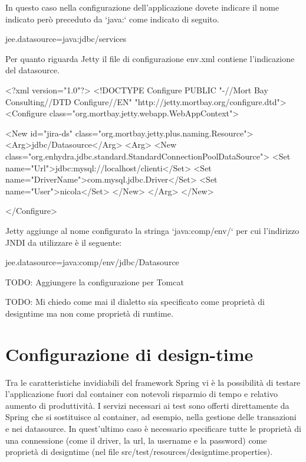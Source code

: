 In questo caso nella configurazione dell'applicazione dovete indicare il nome indicato però preceduto da `java:` come indicato di seguito.

\begin{bash}
jee.datasource=java:jdbc/services
\end{bash}



Per quanto riguarda Jetty il file di configurazione env.xml contiene l'indicazione del datasource.

\begin{xml}
<?xml version="1.0"?>
<!DOCTYPE Configure PUBLIC "-//Mort Bay Consulting//DTD Configure//EN" "http://jetty.mortbay.org/configure.dtd">
<Configure class="org.mortbay.jetty.webapp.WebAppContext">

  <New id="jira-ds" class="org.mortbay.jetty.plus.naming.Resource">
     <Arg>jdbc/Datasource</Arg>
       <Arg>
         <New class="org.enhydra.jdbc.standard.StandardConnectionPoolDataSource">
           <Set name="Url">jdbc:mysql://localhost/clienti</Set>
           <Set name="DriverName">com.mysql.jdbc.Driver</Set>
           <Set name="User">nicola</Set>
         </New>
      </Arg>
  </New>

</Configure>

\end{xml}

Jetty aggiunge al nome configurato la stringa `java:comp/env/` per cui l'indirizzo JNDI da utilizzare è il seguente:

\begin{bash}
jee.datasource=java:comp/env/jdbc/Datasource
\end{bash}

TODO: Aggiungere la configurazione per Tomcat

TODO: Mi chiedo come mai il dialetto sia specificato come proprietà di designtime ma non come proprietà di runtime.



\section{Configurazione di design-time}
Tra le caratteristiche invidiabili del framework Spring vi è la possibilità di testare l'applicazione fuori dal container con notevoli risparmio di tempo e relativo aumento di produttività. I servizi necessari ai test sono offerti direttamente da Spring che si sostituisce al container, ad esempio, nella gestione delle transazioni e nei datasource. In quest'ultimo caso è necessario specificare tutte le proprietà di una connessione (come il driver, la url, la username e la password) come proprietà di designtime (nel file src/test/resources/designtime.properties).

